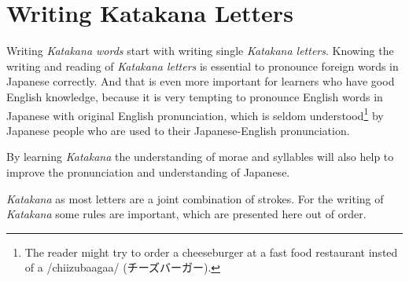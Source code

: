 \section{Writing Katakana Letters}
\label{sec:WritingKatakanaLetters}

Writing \textit{Katakana words} start with writing single \textit{Katakana
letters}. Knowing the writing and reading of \textit{Katakana letters} is
essential to pronounce foreign words in Japanese correctly. And that is even
more important for learners who have good English knowledge, because it is very
tempting to pronounce English words in Japanese with original English
pronunciation, which is seldom understood\footnote{The reader might try to
order a cheeseburger at a fast food restaurant insted of a /chiizubaagaa/
(チーズバーガー).} by Japanese people who are used to their Japanese-English
pronunciation.

By learning \textit{Katakana} the understanding of morae and syllables will
also help to improve the pronunciation and understanding of Japanese.

\textit{Katakana} as most letters are a joint combination of strokes. For the
writing of \textit{Katakana} some rules are important, which are presented here
out of order.


